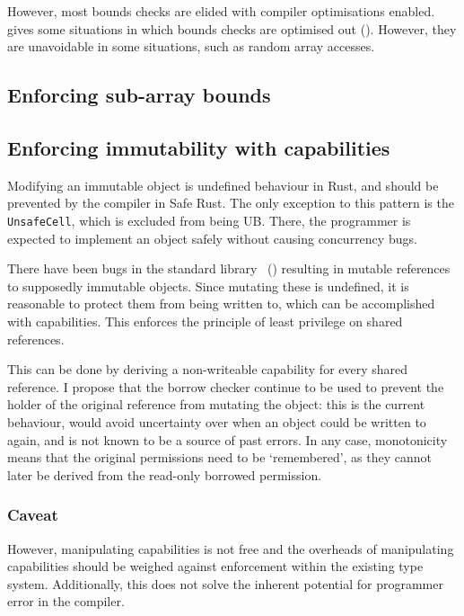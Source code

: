 \documentclass[dissertation.tex]{subfiles}
\begin{document}
However, most bounds checks are elided with compiler optimisations
enabled.
 gives some situations in which bounds checks are
optimised out ().
However, they are unavoidable in some situations, such as random array
accesses.


\subsection{Enforcing sub-array bounds}


\subsection{Enforcing immutability with capabilities}
\label{sec:eval-rust-enforce-immut}

Modifying an immutable object is undefined behaviour in Rust, and should
be prevented by the compiler in Safe Rust.
The only exception to this pattern is the \texttt{UnsafeCell}, which is
excluded from being UB.
There, the programmer is expected to implement an object safely without
causing concurrency bugs.

There have been bugs in the standard library~\cite{rust-issue-vec-mut}
() resulting in mutable references to
supposedly immutable objects.
Since mutating these is undefined, it is reasonable to protect them
from being written to, which can be accomplished with capabilities.
This enforces the principle of least privilege on shared references.

This can be done by deriving a non-writeable capability for every shared
reference.
I propose that the borrow checker continue to be used to prevent the
holder of the original reference from mutating the object: this is the
current behaviour, would avoid uncertainty over when an object could be
written to again, and is not known to be a source of past errors.
In any case, monotonicity means that the original permissions need to be
`remembered', as they cannot later be derived from the read-only
borrowed permission.

\subsubsection{Caveat}
However, manipulating capabilities is not free and the overheads of
manipulating capabilities should be weighed against enforcement within
the existing type system.
Additionally, this does not solve the inherent potential for programmer
error in the compiler.
\end{document}
